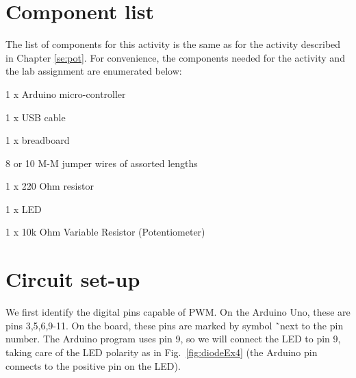 \documentclass[12pt]{book}
\begin{document}
\section{Component list}

The list of components for this activity is the same as for the
activity described in Chapter \ref{se:pot}. For convenience, the
components needed for the activity and the lab assignment are enumerated
below:
\begin{compactitem}[--]
  \item 1 x Arduino micro-controller
  \item 1 x USB cable
  \item 1 x breadboard
  \item 8 or 10 M-M jumper wires of assorted lengths
	\item 1 x 220 Ohm resistor
	\item 1 x LED
  \item 1 x 10k Ohm Variable Resistor (Potentiometer)
\end{compactitem}


\section{Circuit set-up}

We first identify the digital pins capable of PWM. On the Arduino Uno,
these are pins 3,5,6,9-11. On the board, these pins are marked by
symbol
\~\ next to the pin number. The Arduino program uses pin 9, so we will
connect the LED to pin 9, taking
care of the LED polarity as in Fig.~\ref*{fig:diodeEx4} (the Arduino
pin connects to the positive pin on the LED).
\end{document}
